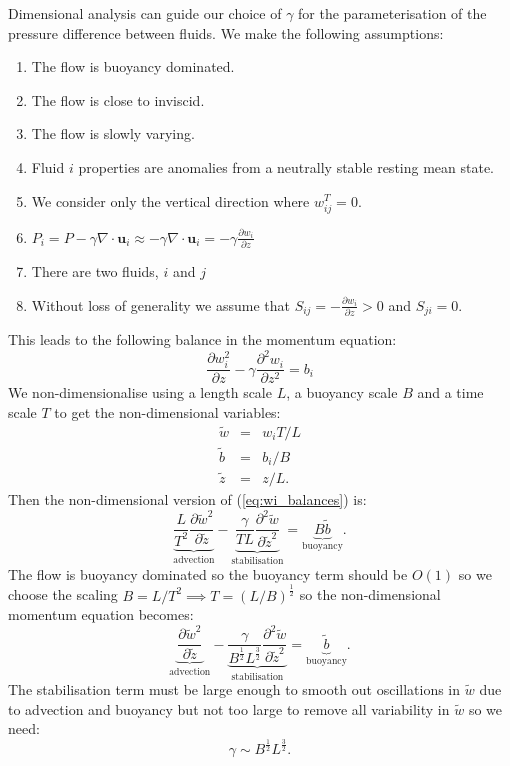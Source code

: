 \documentclass[draft]{agujournal2019}
\begin{document}
Dimensional analysis can guide our choice of $\gamma$ for the parameterisation
of the pressure difference between fluids. We make the following assumptions:
\begin{enumerate}
\item The flow is buoyancy dominated.
\item The flow is close to inviscid.
\item The flow is slowly varying.
\item Fluid $i$ properties are anomalies from a neutrally stable resting
mean state.
\item We consider only the vertical direction where $w_{ij}^{T}=0$.
\item $P_{i}=P-\gamma\nabla\cdot\mathbf{u}_{i}\approx-\gamma\nabla\cdot\mathbf{u}_{i}=-\gamma\frac{\partial w_{i}}{\partial z}$
\item There are two fluids, $i$ and $j$
\item Without loss of generality we assume that $S_{ij}=-\frac{\partial w_{i}}{\partial z}>0$
and $S_{ji}=0$.
\end{enumerate}
This leads to the following balance in the momentum equation:
\begin{equation}
\frac{\partial w_{i}^{2}}{\partial z}-\gamma\frac{\partial^{2}w_{i}}{\partial z^{2}}=b_{i}\label{eq:wi_balances}
\end{equation}
We non-dimensionalise using a length scale $L$, a buoyancy scale
$B$ and a time scale $T$ to get the non-dimensional variables:
\begin{eqnarray*}
\tilde{w} & = & w_{i}T/L\\
\tilde{b} & = & b_{i}/B\\
\tilde{z} & = & z/L.
\end{eqnarray*}
Then the non-dimensional version of (\ref{eq:wi_balances}) is:
\begin{equation}
\underbrace{{\frac{L}{T^{2}}\frac{\partial\tilde{w}^{2}}{\partial\tilde{z}}}}_{\text{advection}}-\underbrace{{\frac{\gamma}{TL}\frac{\partial^{2}\tilde{w}}{\partial\tilde{z}^{2}}}}_{\text{stabilisation}}=\underbrace{B\tilde{b}}_{\text{buoyancy}}.\label{eq:wi_nonDomTmp}
\end{equation}
The flow is buoyancy dominated so the buoyancy term should be $O(1)$
so we choose the scaling $B=L/T^{2}\implies T=(L/B)^{\frac{1}{2}}$
so the non-dimensional momentum equation becomes:
\begin{equation}
\underbrace{{\frac{\partial\tilde{w}^{2}}{\partial\tilde{z}}}}_{\text{advection}}-\underbrace{{\frac{\gamma}{B^{\frac{1}{2}}L^{\frac{3}{2}}}\frac{\partial^{2}\tilde{w}}{\partial\tilde{z}^{2}}}}_{\text{stabilisation}}=\underbrace{\tilde{b}}_{\text{buoyancy}}.\label{eq:wi_nonDom-1}
\end{equation}
The stabilisation term must be large enough to smooth out oscillations
in $\tilde{w}$ due to advection and buoyancy but not too large to
remove all variability in $\tilde{w}$ so we need:
\begin{equation}
\gamma\sim B^{\frac{1}{2}}L^{\frac{3}{2}}.\label{eq:gammaDimAnal}
\end{equation}
\end{document}
